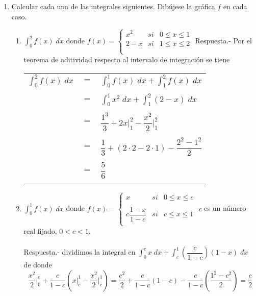 \begin{enumerate}
    \item Calcular cada una de las integrales siguientes. Dibújese la gráfica $f$ en cada caso.
	\begin{enumerate}[\bfseries (a)]

	    \item $\displaystyle\int_0^2 f(x) \; dx$ donde 
		$f(x) =  \left\{ \begin{array}{rcl}
		    x^2&si&0\leq x \leq 1\\
		    2-x&si&1\leq x\leq 2\\\\
		\end{array}\right.$
		Respuesta.-\; Por el teorema de aditividad respecto al intervalo de integración se tiene 
		\begin{center}
		    \begin{tabular}{rcl}
			$\displaystyle\int_0^2 f(x) \; dx$&$=$&$\displaystyle\int_0^1 f(x) \; dx + \int_1^2 f(x) \; dx$\\
			\\&$=$&$\displaystyle\int_0^1 x^2 \; dx + \int_1^2 (2-x) \; dx$\\
			\\&$=$&$\dfrac{1^3}{3} + 2x\bigg|_1^2  - \dfrac{x^2}{2}\bigg|_1^2$\\
			\\&$=$&$\dfrac{1}{3} + (2\cdot 2 - 2\cdot 1) - \dfrac{2^2 - 1^2}{2}$\\
			\\&$=$&$\dfrac{5}{6}$\\\\
		    \end{tabular}
		\end{center}

	    \item $\displaystyle\int_0^1 f(x)\; dx$ donde 
		$f(x) = \left\{ \begin{array}{rcl}
		    x&si&0\leq x \leq c\\
		    \\c\dfrac{1-x}{1-c}&si&c\leq x \leq 1\\
		\end{array}\right.$
		$c$ es un número real fijado, $0<c<1.$\\\\
		Respuesta.-\; dividimos la integral en $\displaystyle\int_0^c x \; dx  + \int_c^1 \left( \dfrac{c}{1-c} \right) (1-x) \; dx$ \; de donde $$\dfrac{x^2}{2}\bigg|_0^c + \dfrac{c}{1-c} \left(x \bigg|_c^1 - \dfrac{x^2}{2}\bigg|_c^1\right) = \dfrac{c^2}{2} + \dfrac{c}{1-c}(1 - c) - \dfrac{c}{1-c}\left(\dfrac{1^2 - c^2}{2}\right) = \dfrac{c}{2}$$\\


\end{enumerate}
\end{enumerate}

